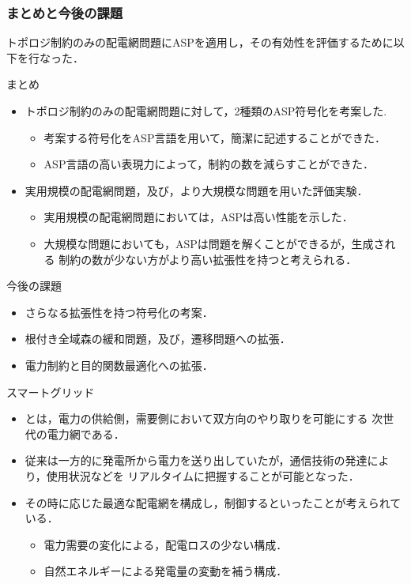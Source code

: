 \documentclass[dvipdfmx,11pt]{beamer}
\begin{document}
\begin{frame}\frametitle{まとめと今後の課題}
 トポロジ制約のみの配電網問題にASPを適用し，その有効性を評価するために以下を行なった．
\begin{block}{まとめ}
 \begin{itemize}
  \item トポロジ制約のみの配電網問題に対して，2種類のASP符号化を考案した.
		\begin{itemize}
		 \item 考案する符号化をASP言語を用いて，簡潔に記述することができた．
		 \item ASP言語の高い表現力によって，制約の数を減らすことができた．
		\end{itemize}
  \item 実用規模の配電網問題，及び，より大規模な問題を用いた評価実験．
		\begin{itemize}
		 \item 実用規模の配電網問題においては，ASPは高い性能を示した．
		 \item 大規模な問題においても，ASPは問題を解くことができるが，生成される
			   制約の数が少ない方がより高い拡張性を持つと考えられる．
		\end{itemize}
 \end{itemize}
 
 \end{block}

 \begin{exampleblock}{今後の課題}
  \begin{itemize}
   \item さらなる拡張性を持つ符号化の考案．
   \item 根付き全域森の緩和問題，及び，遷移問題への拡張．
   \item 電力制約と目的関数最適化への拡張．
  \end{itemize}
 \end{exampleblock}
\end{frame}
  
\begin{frame}{スマートグリッド}
 \begin{itemize}
  \item {}とは，電力の供給側，需要側において双方向のやり取りを可能にする
		次世代の電力網である．
  \item 従来は一方的に発電所から電力を送り出していたが，通信技術の発達により，使用状況などを
		リアルタイムに把握することが可能となった．
  \item その時に応じた最適な配電網を構成し，制御するといったことが考えられている．
		\begin{itemize}
		 \item 電力需要の変化による，配電ロスの少ない構成．
		 \item 自然エネルギーによる発電量の変動を補う構成．
		\end{itemize}
 \end{itemize}
\end{frame}
\end{document}
